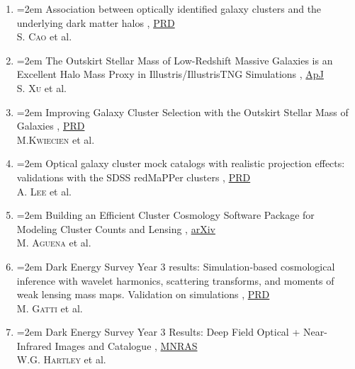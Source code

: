 \documentclass{scrartcl}
\newcommand{\paper}[1]{\noindent\hangindent=2em\hangafter=0 \footnotesize #1  %
\vspace{0.5em}} %
\begin{document}
\begin{cv}{}
\begin{enumerate}
        \textsc{DESI Collaboration}
        \item \paper{Association between optically identified galaxy clusters and the underlying dark matter halos}, \href{https://journals.aps.org/prd/abstract/10.1103/r7tt-bzs7}{PRD}\\
        \textsc{S. Cao} et al.
        \item \paper{The Outskirt Stellar Mass of Low-Redshift Massive Galaxies is an Excellent Halo Mass Proxy in Illustris/IllustrisTNG Simulations}, \href{https://iopscience.iop.org/article/10.3847/1538-4357/adeca0/meta}{ApJ}\\
        \textsc{S. Xu} et al.
        \item \paper{Improving Galaxy Cluster Selection with the Outskirt Stellar Mass of Galaxies}, \href{https://journals.aps.org/prd/abstract/10.1103/1j5f-cmkg}{PRD}\\
        \textsc{M.Kwiecien} et al.
        \item \paper{Optical galaxy cluster mock catalogs with realistic projection effects: validations with the SDSS redMaPPer clusters}, \href{https://arxiv.org/abs/2410.02497}{PRD}\\
        \textsc{A. Lee} et al. 
        \item \paper{Building an Efficient Cluster Cosmology Software Package for Modeling Cluster Counts and Lensing}, \href{https://arxiv.org/abs/2309.06593}{arXiv}\\
        \textsc{M. Aguena} et al. 
        \item \paper{Dark Energy Survey Year 3 results: Simulation-based cosmological inference with wavelet harmonics, scattering transforms, and moments of weak lensing mass maps. Validation on simulations}, \href{https://journals.aps.org/prd/abstract/10.1103/PhysRevD.109.063534}{PRD}\\
        \textsc{M. Gatti} et al. 
        \item \paper{Dark Energy Survey Year 3 Results: Deep Field Optical + Near-Infrared Images and Catalogue}, \href{https://academic.oup.com/mnras/article/509/3/3547/6412546}{MNRAS}\\
        \textsc{W.G. Hartley} et al. 
    \end{enumerate}

    \vspace{1em} %

    \vspace{1em}


\end{cv}
\end{document}

